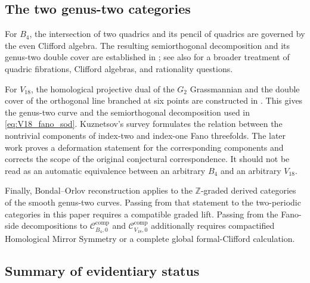 \documentclass[11pt]{amsart}
\theoremstyle{definition}
\theoremstyle{remark}
\newcommand{\CcompB}{\mathcal C^{\mathrm{comp}}_{B_4,0}}
\newcommand{\CcompV}{\mathcal C^{\mathrm{comp}}_{V_{18},0}}
\begin{document}
\subsection{The two genus-two categories}

For $B_4$, the intersection of two quadrics and its pencil of quadrics are
governed by the even Clifford algebra.  The resulting semiorthogonal
decomposition and its genus-two double cover are established in
\cite{KuzQuadric}; see also \cite{AuelBernardaraBolognesi} for a broader
treatment of quadric fibrations, Clifford algebras, and rationality questions.

For $V_{18}$, the homological projective dual of the $G_2$ Grassmannian and the
double cover of the orthogonal line branched at six points are constructed in
\cite{KuzHyperplane}.  This gives the genus-two curve and the
semiorthogonal decomposition used in \eqref{eq:V18_fano_sod}.  Kuznetsov's
survey \cite{KuzFano} formulates the relation between the nontrivial components
of index-two and index-one Fano threefolds.  The later work
\cite{KuzShinder} proves a deformation statement for the corresponding
components and corrects the scope of the original conjectural correspondence.
It should not be read as an automatic equivalence between an arbitrary
$B_4$ and an arbitrary $V_{18}$.

Finally, Bondal--Orlov reconstruction \cite{BondalOrlov} applies to the
$\mathbb Z$-graded derived categories of the smooth genus-two curves.  Passing
from that statement to the two-periodic categories in this paper requires a
compatible graded lift.  Passing from the Fano-side decompositions to
$\CcompB$ and $\CcompV$ additionally requires compactified Homological Mirror
Symmetry or a complete global formal-Clifford calculation.

\subsection{Summary of evidentiary status}
\end{document}
